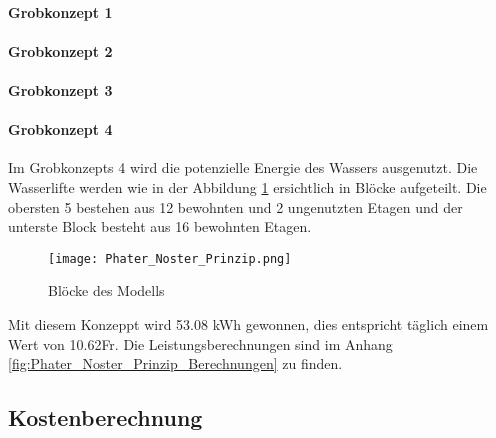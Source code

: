 \bigskip

\paragraph{Grobkonzept 1} 



\paragraph{Grobkonzept 2}

\paragraph{Grobkonzept 3}

\paragraph{Grobkonzept 4}

Im Grobkonzepts 4 wird die potenzielle Energie des Wassers ausgenutzt. Die Wasserlifte werden wie in der Abbildung \ref{fig:BloeckeDesModells}  ersichtlich in Blöcke aufgeteilt. Die obersten 5 bestehen aus 12 bewohnten und 2 ungenutzten Etagen und der unterste Block besteht aus 16 bewohnten Etagen.

\begin{figure} [H]
	\centering
	\texttt{[image: Phater\_Noster\_Prinzip.png]}
	\caption{Blöcke des Modells}
	\label{fig:BloeckeDesModells}
\end{figure}

Mit diesem Konzeppt wird 53.08 \si{kWh} gewonnen, dies entspricht täglich einem Wert von
10.62\si{Fr}. Die Leistungsberechnungen sind im Anhang \ref{fig:Phater_Noster_Prinzip_Berechnungen}  zu finden.

\newpage

\subsection{Kostenberechnung} \label{subsec:kostenberechnung}